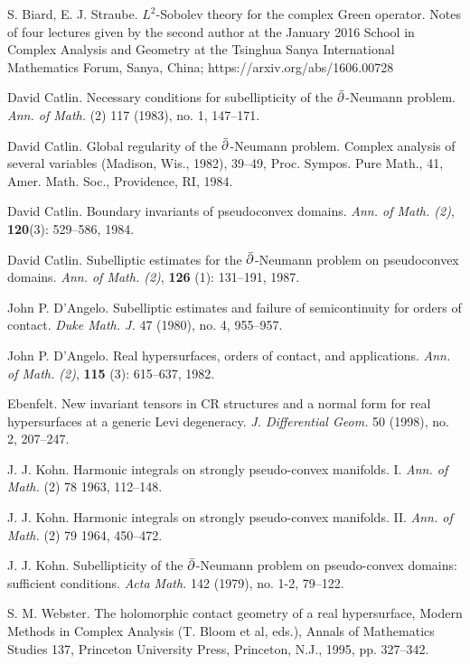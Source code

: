 \documentclass[12pt]{amsart}
\begin{document}
\begin{thebibliography}{BER96}

S. Biard, E. J. Straube.
$L^2$-Sobolev theory for the complex Green operator. 
Notes of four lectures given by the second author at the January 2016 School in Complex Analysis and Geometry at the Tsinghua Sanya International Mathematics Forum, Sanya, China;
{\sf https://arxiv.org/abs/1606.00728}

  David Catlin. Necessary conditions for subellipticity of the $\bar{\partial}$-Neumann problem. {\em Ann. of Math.} (2) 117 (1983), no. 1, 147--171.

  David Catlin. Global regularity of the $\bar{\partial}$-Neumann problem. Complex analysis of several variables (Madison, Wis., 1982), 39--49, Proc. Sympos. Pure Math., 41, Amer. Math. Soc., Providence, RI, 1984.

  David Catlin. Boundary invariants of pseudoconvex domains. {\em Ann. of Math. (2)}, {\bf 120}(3):  529--586, 1984.

 David Catlin. Subelliptic estimates for the $\bar{\partial}$-Neumann problem on pseudoconvex domains. {\em Ann. of Math. (2)}, {\bf 126} (1): 131--191, 1987.

  John P. D'Angelo.
Subelliptic estimates and failure of semicontinuity for orders of contact. 
{\em Duke Math. J.} 47 (1980), no. 4, 955--957.

 John P. D'Angelo. Real hypersurfaces, orders of contact, and applications. 
{\em Ann. of Math. (2)}, {\bf 115} (3): 615--637, 1982.

 Ebenfelt. New invariant tensors in CR structures and a normal form for real hypersurfaces at a generic Levi degeneracy. {\em J. Differential Geom.} 50 (1998), no. 2, 207--247. 

 J. J. Kohn. Harmonic integrals on strongly pseudo-convex manifolds. I. {\em Ann. of Math.} (2) 78 1963, 112--148.

 J. J. Kohn. Harmonic integrals on strongly pseudo-convex manifolds. II. {\em Ann. of Math.} (2) 79 1964, 450--472.

 J. J. Kohn. Subellipticity of the $\bar{\partial}$-Neumann problem on pseudo-convex domains: sufficient conditions. {\em Acta Math.} 142 (1979), no. 1-2, 79--122.


 S. M. Webster. The holomorphic contact geometry of a real hypersurface, Modern Methods in Complex Analysis (T. Bloom et al, eds.), Annals of Mathematics Studies 137, Princeton University Press, Princeton, N.J., 1995, pp. 327--342.

\end{thebibliography}
\end{document}
